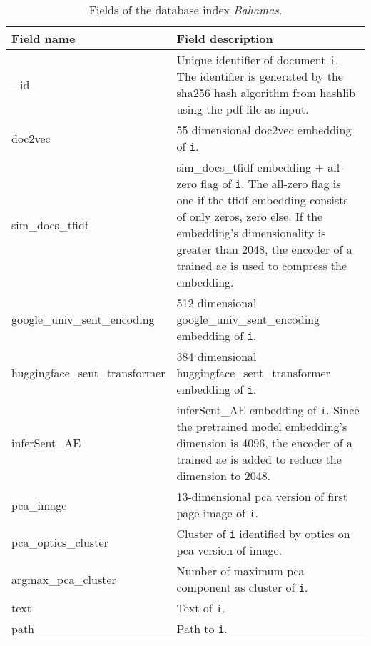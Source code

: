 \begin{table}[]
    \caption{Fields of the \databaseName{} database index \textit{Bahamas}.}
    \begin{tabular}{|
    >{\columncolor[HTML]{EFEFEF}}l |p{}|}
    \hline
    \cellcolor[HTML]{C0C0C0}\textbf{Field name} & \cellcolor[HTML]{C0C0C0}\textbf{Field description}                                     \\ \hline
    \_id                                        & Unique identifier of document \texttt{i}. The identifier is generated by the sha256 hash algorithm from hashlib using the \ac{pdf} file as input.\\ \hline
    doc2vec                                     & 55 dimensional doc2vec embedding of \texttt{i}.                                                          \\ \hline
    sim\_docs\_tfidf                            & sim\_docs\_tfidf embedding + all-zero flag of \texttt{i}. The all-zero flag is one if the \ac{tfidf} embedding consists of only zeros, zero else. If the embedding's dimensionality is greater than 2048, the encoder of a trained \ac{ae} is used to compress the embedding.\\ \hline
    google\_univ\_sent\_encoding                & 512 dimensional google\_univ\_sent\_encoding embedding of \texttt{i}.                                     \\ \hline
    huggingface\_sent\_transformer              & 384 dimensional huggingface\_sent\_transformer embedding of \texttt{i}.                                  \\ \hline
    inferSent\_AE                               & inferSent\_AE embedding of \texttt{i}. Since the pretrained \infersent{} model embedding's dimension is 4096, the encoder of a trained \ac{ae} is added to reduce the dimension to 2048.                                                    \\ \hline
    pca\_image                                  & 13-dimensional \ac{pca} version of first page image of \texttt{i}.                      \\ \hline
    pca\_optics\_cluster                        & Cluster of \texttt{i} identified by \acs{optics} on \ac{pca} version of image.            \\ \hline
    argmax\_pca\_cluster                        & Number of maximum \ac{pca} component as cluster of \texttt{i}.                            \\ \hline
    text                                        & Text of \texttt{i}.                                                                       \\ \hline
    path                                        & Path to \texttt{i}.                                                     \\ \hline
    \end{tabular}
    \label{tbl:Elasticsearch-fields}
\end{table}

